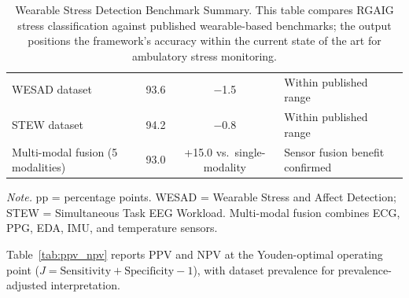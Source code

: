 \begin{table}[H]
\tablestripes
\caption[Wearable Stress Detection Benchmark Summary]{Wearable Stress Detection Benchmark Summary. This table compares RGAIG stress classification against published wearable-based benchmarks; the output positions the framework's accuracy within the current state of the art for ambulatory stress monitoring.}
\tablefontsize
\begin{tabularx}{\textwidth}{@{} L C C L @{}}
\toprule
{} &  &  &  \\
\midrule
WESAD dataset & 93.6 & $-$1.5 & Within published range \\
STEW dataset & 94.2 & $-$0.8 & Within published range \\
Multi-modal fusion (5 modalities) & 93.0 & +15.0 vs.\ single-modality & Sensor fusion benefit confirmed \\
\bottomrule
\end{tabularx}
\vspace{0.5em}\noindent\textit{Note.} pp = percentage points. WESAD = Wearable Stress and Affect Detection; STEW = Simultaneous Task EEG Workload. Multi-modal fusion combines ECG, PPG, EDA, IMU, and temperature sensors.
\end{table}


Table~\ref{tab:ppv_npv} reports PPV and NPV at the Youden-optimal operating point ($J = \text{Sensitivity} + \text{Specificity} - 1$), with dataset prevalence for prevalence-adjusted interpretation.

